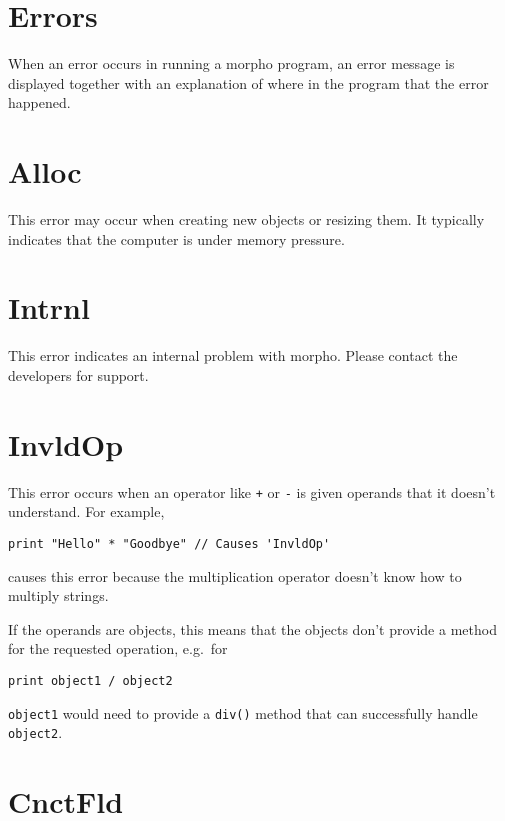\hypertarget{errors}{%
\section{Errors}\label{errors}}

When an error occurs in running a morpho program, an error message is
displayed together with an explanation of where in the program that the
error happened.

\hypertarget{alloc}{%
\section{Alloc}\label{alloc}}

This error may occur when creating new objects or resizing them. It
typically indicates that the computer is under memory pressure.

\hypertarget{intrnl}{%
\section{Intrnl}\label{intrnl}}

This error indicates an internal problem with morpho. Please contact the
developers for support.

\hypertarget{invldop}{%
\section{InvldOp}\label{invldop}}

This error occurs when an operator like \texttt{+} or \texttt{-} is
given operands that it doesn't understand. For example,

\begin{lstlisting}
print "Hello" * "Goodbye" // Causes 'InvldOp'
\end{lstlisting}

causes this error because the multiplication operator doesn't know how
to multiply strings.

If the operands are objects, this means that the objects don't provide a
method for the requested operation, e.g.~for

\begin{lstlisting}
print object1 / object2
\end{lstlisting}

\texttt{object1} would need to provide a \texttt{div()} method that can
successfully handle \texttt{object2}.

\hypertarget{cnctfld}{%
\section{CnctFld}\label{cnctfld}}

